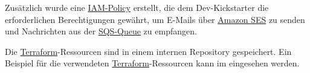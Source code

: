 Zusätzlich wurde eine \hyperlink{SES}{\textcolor{AOBlau}{IAM-Policy}} erstellt, die dem Dev-Kickstarter die erforderlichen Berechtigungen gewährt, um E-Mails über \hyperlink{SES}{\textcolor{AOBlau}{Amazon SES}} zu senden und Nachrichten aus der \hyperlink{SQS}{\textcolor{AOBlau}{SQS-Queue}} zu empfangen. 

Die \hyperlink{Terraform}{\textcolor{AOBlau}{Terraform}}-Ressourcen sind in einem internen Repository gespeichert. Ein Beispiel für die verwendeten \hyperlink{Terraform}{\textcolor{AOBlau}{Terraform}}-Ressourcen kann im  eingesehen werden.
